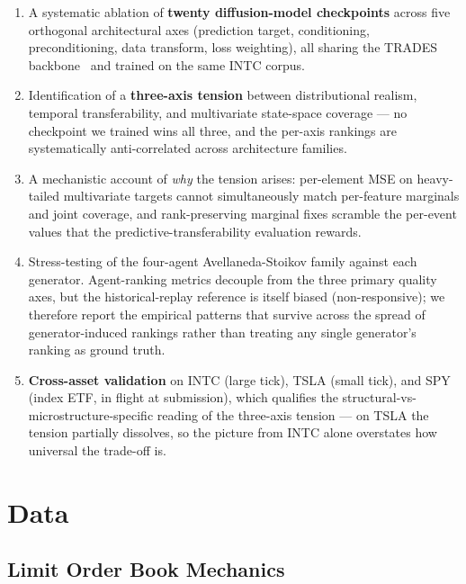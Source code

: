 \documentclass[journal]{IEEEtran}
\theoremstyle{definition}   %
\begin{document}
\begin{enumerate}
    \item A systematic ablation of \textbf{twenty diffusion-model
    checkpoints} across five orthogonal architectural axes (prediction
    target, conditioning, preconditioning, data transform, loss
    weighting), all sharing the TRADES backbone~\cite{berti2025trades}
    and trained on the same INTC corpus.
    \item Identification of a \textbf{three-axis tension} between
    distributional realism, temporal transferability, and multivariate
    state-space coverage --- no checkpoint we trained wins all three,
    and the per-axis rankings are systematically anti-correlated across
    architecture families.
    \item A mechanistic account of \emph{why} the tension arises:
    per-element MSE on heavy-tailed multivariate targets cannot
    simultaneously match per-feature marginals and joint coverage, and
    rank-preserving marginal fixes scramble the per-event values that
    the predictive-transferability evaluation rewards.
    \item Stress-testing of the four-agent Avellaneda-Stoikov family
    against each generator. Agent-ranking metrics
    decouple from the three primary quality axes, but the
    historical-replay reference is itself biased (non-responsive); we
    therefore report the empirical patterns that survive across the
    spread of generator-induced rankings rather than treating any
    single generator's ranking as ground truth.
    \item \textbf{Cross-asset validation} on INTC (large tick), TSLA
    (small tick), and SPY (index ETF, in flight at submission), which
    qualifies the structural-vs-microstructure-specific reading of the
    three-axis tension --- on TSLA the tension partially dissolves, so
    the picture from INTC alone overstates how universal the trade-off
    is.
\end{enumerate}

\section{Data}
\label{sec:data}

\subsection{Limit Order Book Mechanics}
\label{sec:lob_mechanics}
\end{document}

